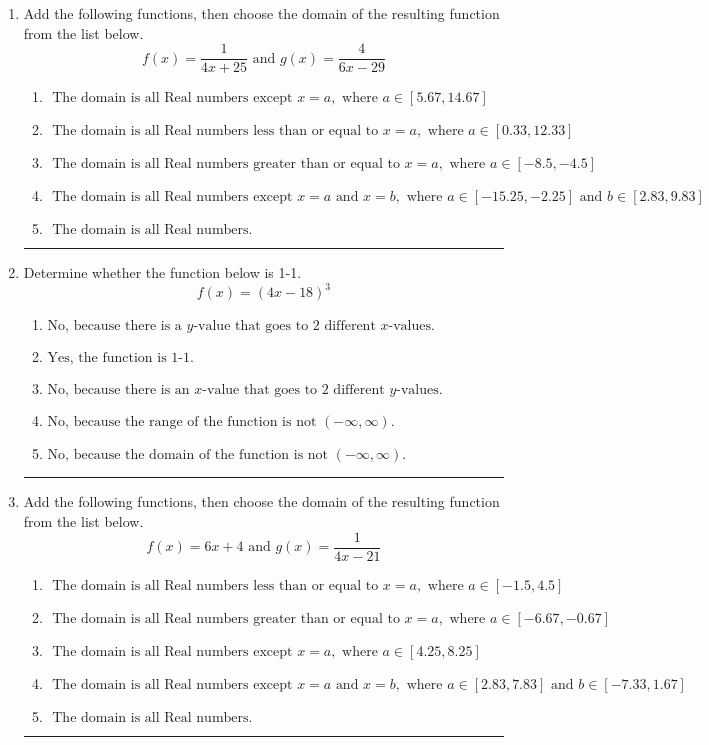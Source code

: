 \documentclass[14pt]{extbook}
\newcommand{\litem}[1]{\item#1\hspace*{-1cm}\rule{\textwidth}{0.4pt}}
\begin{document}
\begin{enumerate}
{\begin{enumerate}[label=\Alph*.]
\end{enumerate} }
\litem{
Add the following functions, then choose the domain of the resulting function from the list below.\[ f(x) = \frac{1}{4x+25} \text{ and } g(x) = \frac{4}{6x-29} \]\begin{enumerate}[label=\Alph*.]
\item \( \text{ The domain is all Real numbers except } x = a, \text{ where } a \in [5.67, 14.67] \)
\item \( \text{ The domain is all Real numbers less than or equal to } x = a, \text{ where } a \in [0.33, 12.33] \)
\item \( \text{ The domain is all Real numbers greater than or equal to } x = a, \text{ where } a \in [-8.5, -4.5] \)
\item \( \text{ The domain is all Real numbers except } x = a \text{ and } x = b, \text{ where } a \in [-15.25, -2.25] \text{ and } b \in [2.83, 9.83] \)
\item \( \text{ The domain is all Real numbers. } \)

\end{enumerate} }
\litem{
Determine whether the function below is 1-1.\[ f(x) = (4 x - 18)^3 \]\begin{enumerate}[label=\Alph*.]
\item \( \text{No, because there is a $y$-value that goes to 2 different $x$-values.} \)
\item \( \text{Yes, the function is 1-1.} \)
\item \( \text{No, because there is an $x$-value that goes to 2 different $y$-values.} \)
\item \( \text{No, because the range of the function is not $(-\infty, \infty)$.} \)
\item \( \text{No, because the domain of the function is not $(-\infty, \infty)$.} \)

\end{enumerate} }
\litem{
Add the following functions, then choose the domain of the resulting function from the list below.\[ f(x) = 6x + 4 \text{ and } g(x) = \frac{1}{4x-21} \]\begin{enumerate}[label=\Alph*.]
\item \( \text{ The domain is all Real numbers less than or equal to } x = a, \text{ where } a \in [-1.5, 4.5] \)
\item \( \text{ The domain is all Real numbers greater than or equal to } x = a, \text{ where } a \in [-6.67, -0.67] \)
\item \( \text{ The domain is all Real numbers except } x = a, \text{ where } a \in [4.25, 8.25] \)
\item \( \text{ The domain is all Real numbers except } x = a \text{ and } x = b, \text{ where } a \in [2.83, 7.83] \text{ and } b \in [-7.33, 1.67] \)
\item \( \text{ The domain is all Real numbers. } \)

\end{enumerate} }
\end{enumerate}
\end{document}
